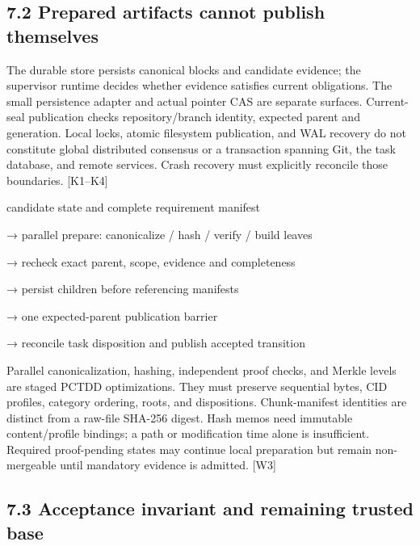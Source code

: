 \documentclass{article}
\begin{document}
\subsection*{7.2 Prepared artifacts cannot publish themselves}

The durable store persists canonical blocks and candidate evidence; the supervisor runtime decides
whether evidence satisfies current obligations. The small persistence adapter and actual pointer CAS
are separate surfaces. Current-seal publication checks repository/branch identity, expected parent and
generation. Local locks, atomic filesystem publication, and WAL recovery do not constitute global
distributed consensus or a transaction spanning Git, the task database, and remote services. Crash
recovery must explicitly reconcile those boundaries. [K1–K4]




\noindent candidate state and complete requirement manifest\par
\noindent → parallel prepare: canonicalize / hash / verify / build leaves\par
\noindent → recheck exact parent, scope, evidence and completeness\par
\noindent → persist children before referencing manifests\par
\noindent → one expected-parent publication barrier\par
\noindent → reconcile task disposition and publish accepted transition\par

Parallel canonicalization, hashing, independent proof checks, and Merkle levels are staged PCTDD
optimizations. They must preserve sequential bytes, CID profiles, category ordering, roots, and
dispositions. Chunk-manifest identities are distinct from a raw-file SHA-256 digest. Hash memos
need immutable content/profile bindings; a path or modification time alone is insufficient. Required
proof-pending states may continue local preparation but remain non-mergeable until mandatory
evidence is admitted. [W3]

\subsection*{7.3 Acceptance invariant and remaining trusted base}
\end{document}

